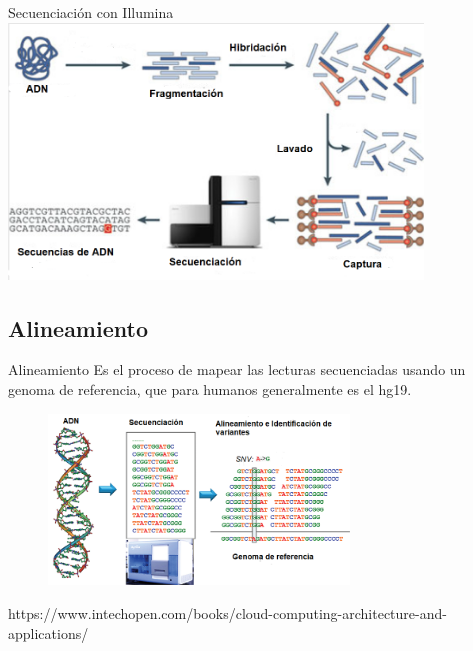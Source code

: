 \documentclass[xcolor=dvipsnames]{beamer}
\begin{document}
\begin{frame}{Secuenciación con Illumina}
	\centering
	\includegraphics[width=11cm]{secuenciacion1.png}
\end{frame}

\subsection{Alineamiento}

\begin{frame}{Alineamiento}
	\justifying
	Es el proceso de mapear las lecturas secuenciadas usando un genoma de referencia, que para humanos generalmente es el hg19.
	\hfill \break
	
	\begin{figure}
	\centering
	\includegraphics[width=8cm]{resumenngs.png}
	\end{figure}
\justifying
\tiny{https://www.intechopen.com/books/cloud-computing-architecture-and-applications/}	
\end{frame}
\end{document}
